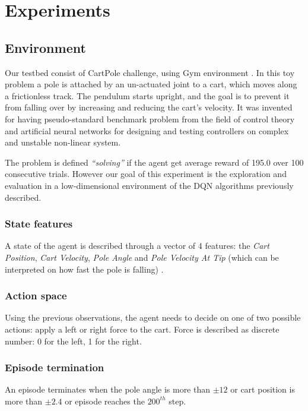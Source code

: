 \section{Experiments}

\subsection{Environment}
Our testbed consist of CartPole challenge, using Gym environment \cite{Gym}.
In this toy problem a pole is attached by an un-actuated joint to a cart, which moves along a frictionless track. The pendulum starts upright, and the goal is to prevent it from falling over by increasing and reducing the cart's velocity. It was invented for having pseudo-standard benchmark problem from the field of control theory and artificial neural networks for designing and testing controllers on complex and unstable non-linear system.

The problem is defined \textit{``solving''} if the agent get average reward of 195.0 over 100 consecutive trials. However our goal of this experiment is the exploration and evaluation in a low-dimensional environment of the DQN algorithms previously described.
 
\subsubsection{State features}
A state of the agent is described through a vector of 4 features: the  \textit{Cart Position}, \textit{Cart Velocity}, \textit{Pole Angle} and \textit{Pole Velocity At Tip} (which can be interpreted on how fast the pole is falling) .

\subsubsection{Action space}
Using the previous observations, the agent needs to decide on one of two possible actions: apply a left or right force to the cart. Force is described as discrete number: 0 for the left, 1 for the right.




\subsubsection{Episode termination}
An episode terminates when the pole angle is more than $\pm12$ or cart position is more than $\pm2.4$ or episode reaches the $200^{th}$ step.

